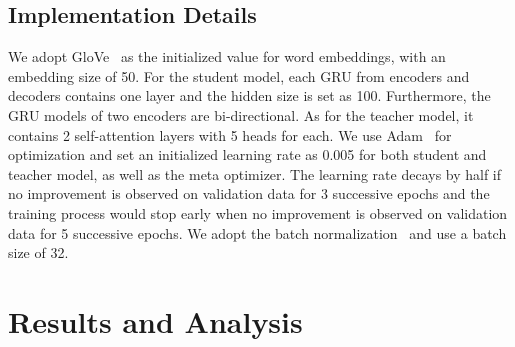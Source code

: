 \documentclass[letterpaper]{article} %
\begin{document}
\subsection*{Implementation Details}
We adopt GloVe~\citep{pennington2014glove} as the initialized value for word embeddings, with an embedding size of 50. For the student model, each GRU from encoders and decoders contains one layer and the hidden size is set as 100. Furthermore, the GRU models of two encoders are bi-directional. As for the teacher model, it contains 2 self-attention layers with 5 heads for each. We use Adam~\citep{kingma2014adam} for optimization and set an initialized learning rate as 0.005 for both student and teacher model, as well as the meta optimizer. The learning rate decays by half if no improvement is observed on validation data for 3 successive epochs and the training process would stop early when no improvement is observed on validation data for 5 successive epochs. We adopt the batch normalization~\citep{ioffe2015batch} and use a batch size of 32.









\section*{Results and Analysis}
\end{document}
